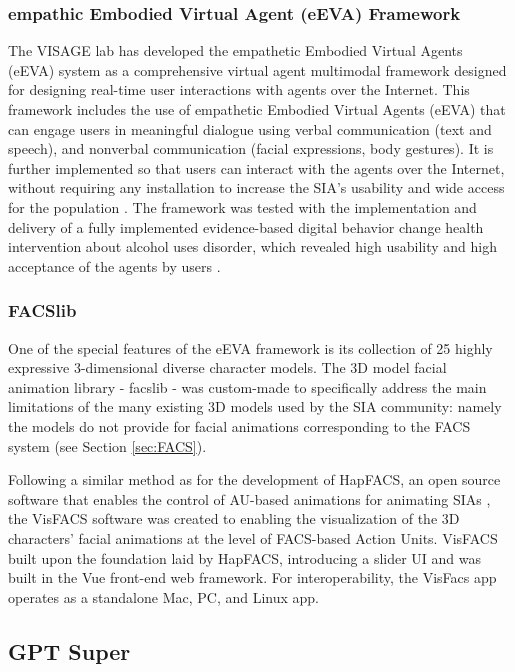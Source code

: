 \documentclass[12pt]{article}
\begin{document}
\subsubsection{empathic Embodied Virtual Agent (eEVA) Framework}
The VISAGE lab has developed the empathetic Embodied Virtual Agents (eEVA) system as 
 a comprehensive virtual agent multimodal framework designed for designing real-time user interactions with agents over the Internet. This framework includes the use of empathetic Embodied Virtual Agents (eEVA) that can engage users in meaningful dialogue using verbal communication (text and speech), and nonverbal communication (facial expressions, body gestures).  It is further implemented so that users can interact with the agents over the Internet, without requiring any installation to increase the SIA's usability and wide access for the population  \cite{PolceanuLisetti2019Online}.  The framework was tested with the implementation and delivery of a fully implemented evidence-based digital behavior change health intervention about alcohol uses disorder, which revealed high usability and high acceptance of the agents by users \cite{Boustani2021}.

\subsubsection{FACSlib}
\label{sec:facslib}

One of the special features of the eEVA framework is its collection of 25 highly expressive 3-dimensional diverse character models.  The 3D model facial animation library - facslib - was custom-made to specifically address the  main limitations of the many existing 3D models used by the SIA community: namely the models do not provide for facial animations corresponding to the FACS system (see Section \ref{sec:FACS}).

Following a similar method as for the development of HapFACS, an open source  software that enables the control of AU-based animations for animating SIAs \cite{Amini2015}, the VisFACS software was created to enabling the visualization of the 3D characters' facial animations at the level of FACS-based Action Units. 
VisFACS built upon the foundation laid by HapFACS, introducing a slider UI and was built in the Vue front-end web framework. For interoperability, the VisFacs app operates as a standalone Mac, PC, and Linux app.

\subsection{GPT Super}
\end{document}
